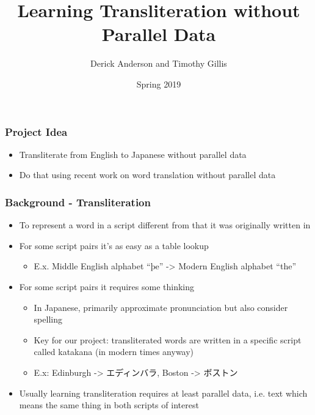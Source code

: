 \documentclass{beamer}
\title{Learning Transliteration without Parallel Data}
\author{Derick Anderson and Timothy Gillis}
\date{Spring 2019}
\begin{document}
 
\frame{\titlepage}
 
\begin{frame}
  \frametitle{Project Idea}

  \begin{itemize}
  \item Transliterate from English to Japanese without parallel data
  \item Do that using recent work on word translation without parallel data
  \end{itemize}

\end{frame}

\begin{frame}
  \frametitle{Background - Transliteration}

  \begin{itemize}
  \item To represent a word in a script different from that it was originally
    written in
  \item For some script pairs it's as easy as a table lookup
    \begin{itemize}
      \item E.x. Middle English alphabet ``þe'' -> Modern English alphabet ``the''
    \end{itemize}

  \item For some script pairs it requires some thinking
    \begin{itemize}
    \item In Japanese, primarily approximate pronunciation but also consider
      spelling
    \item Key for our project: transliterated words are written in a specific
      script called katakana (in modern times anyway)
    \item E.x: Edinburgh -> エディンバラ, Boston -> ボストン
    \end{itemize}

  \item Usually learning transliteration requires at least parallel data,
    i.e. text which means the same thing in both scripts of interest
  \end{itemize}

\end{frame}
\end{document}
